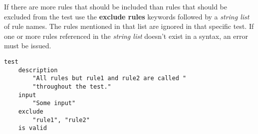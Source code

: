 

If there are more rules that should be included than rules that should be
excluded from the test use the \textbf{exclude rules} keywords followed by a 
\textit{string list} of rule names. The rules mentioned in that list are ignored
in that specific test. If one or more rules referenced in the 
\textit{string list} doesn't exist in a syntax, an error must be issued.

\begin{lstlisting}[style = SrtL]
test
    description
        "All rules but rule1 and rule2 are called "
        "throughout the test."
    input 
        "Some input"
    exclude
        "rule1", "rule2"
    is valid
\end{lstlisting}